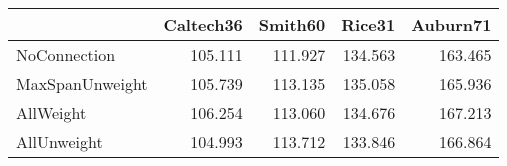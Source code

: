 \begin{tabular}{lrrrr}
\toprule
{} & Caltech36 & Smith60 &  Rice31 & Auburn71 \\
\midrule
NoConnection    &   105.111 & 111.927 & 134.563 &  163.465 \\
MaxSpanUnweight &   105.739 & 113.135 & 135.058 &  165.936 \\
AllWeight       &   106.254 & 113.060 & 134.676 &  167.213 \\
AllUnweight     &   104.993 & 113.712 & 133.846 &  166.864 \\
\bottomrule
\end{tabular}

